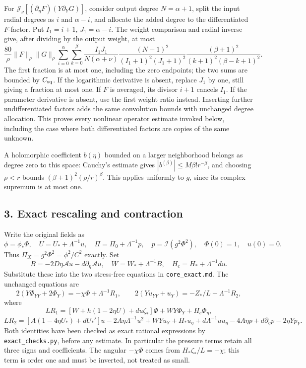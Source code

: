 \documentclass[10pt,a4paper]{article}
\begin{document}
For \(\mathcal J_\nu[(\partial_\eta F)(Y\partial_YG)]\), consider output degree \(N=\alpha+1\), split the input radial degrees as \(i\) and \(\alpha-i\), and allocate the added degree to the differentiated \(F\)-factor. Put \(I_1=i+1\), \(J_1=\alpha-i\). The weight comparison and radial inverse give, after dividing by the output weight, at most
\[
\frac{80}{\rho}\|F\|_\rho\|G\|_\rho
\sum_{i=0}^\alpha\sum_{k=0}^\beta
\frac{I_1J_1}{N(\alpha+\nu)}
\frac{(N+1)^2}{(I_1+1)^2(J_1+1)^2}
\frac{(\beta+1)^2}{(k+1)^2(\beta-k+1)^2}.
\]
The first fraction is at most one, including the zero endpoints; the two sums are bounded by \(C_{\rm sq}\). If the logarithmic derivative is absent, replace \(J_1\) by one, still giving a fraction at most one. If \(F\) is averaged, its divisor \(i+1\) cancels \(I_1\). If the parameter derivative is absent, use the first weight ratio instead. Inserting further undifferentiated factors adds the same convolution bounds with unchanged degree allocation. This proves every nonlinear operator estimate invoked below, including the case where both differentiated factors are copies of the same unknown.

A holomorphic coefficient \(b(\eta)\) bounded on a larger neighborhood belongs as degree zero to this space: Cauchy's estimate gives \(|b^{(\beta)}|\le M\beta!r^{-\beta}\), and choosing \(\rho<r\) bounds \((\beta+1)^2(\rho/r)^\beta\). This applies uniformly to \(g\), since its complex supremum is at most one.

\subsection{3. Exact rescaling and contraction}

Write the original fields as
\[
\phi=\phi_*\Phi,\quad U=U_*+\Lambda^{-1}u,
\quad \Pi=\Pi_0+\Lambda^{-1}p,
\quad p=\mathcal I(g^2\Phi^2),\quad \Phi(0)=1,\quad u(0)=0.
\]
Thus \(\Pi_X=g^2\Phi^2=\phi^2/C^2\) exactly. Set
\[
B=-2D\eta\mathcal A u-d\partial_\eta\mathcal A u,
\quad W=W_*+\Lambda^{-1}B,\quad H_c=H_*+\Lambda^{-1}du.
\]
Substitute these into the two stress-free equations in \texttt{core\_exact.md}. The unchanged equations are
\[
2(Y\Phi_{YY}+2\Phi_Y)=-\chi\Phi+\Lambda^{-1}R_1,
\qquad 2(Yu_{YY}+u_Y)=-Z_*/L+\Lambda^{-1}R_2,
\]
where
\[
LR_1=[W+h(1-2\eta U)+du\zeta_*]\Phi+WY\Phi_Y+H_c\Phi_\eta,
\]
\[
LR_2=[A(1-4\eta U_*)+dU_*']u-2A\eta\Lambda^{-1}u^2
+WYu_Y+H_*u_\eta+d\Lambda^{-1}uu_\eta
-4A\eta p+d\partial_\eta p-2\eta Yp_Y.
\]
Both identities have been checked as exact rational expressions by \texttt{exact\_checks.py}, before any estimate. In particular the pressure terms retain all three signs and coefficients. The angular \(-\chi\Phi\) comes from \(H_*\zeta_*/L=-\chi\); this term is order one and must be inverted, not treated as small.
\end{document}

